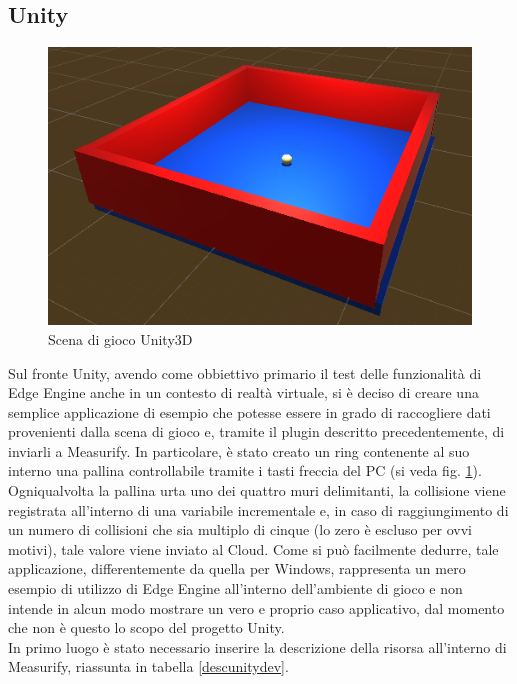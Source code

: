 \subsection{Unity}
\begin{figure}[H]
	\centering
	\includegraphics[scale=1.1]{pics/ring}
	\caption{Scena di gioco Unity3D}
	\label{ring}
\end{figure}
Sul fronte Unity, avendo come obbiettivo primario il test delle funzionalità di Edge Engine anche in un contesto di realtà virtuale, si è deciso di creare una semplice applicazione di esempio che potesse essere in grado di raccogliere dati provenienti dalla scena di gioco e, tramite il plugin descritto precedentemente, di inviarli a Measurify. In particolare, è stato creato un ring contenente al suo interno una pallina controllabile tramite i tasti freccia del PC (si veda fig. \ref{ring}). Ogniqualvolta la pallina urta uno dei quattro muri delimitanti, la collisione viene registrata all'interno di una variabile incrementale e, in caso di raggiungimento di un numero di collisioni che sia multiplo di cinque (lo zero è escluso per ovvi motivi), tale valore viene inviato al Cloud. Come si può facilmente dedurre, tale applicazione, differentemente da quella per Windows, rappresenta un mero esempio di utilizzo di Edge Engine all'interno dell'ambiente di gioco e non intende in alcun modo mostrare un vero e proprio caso applicativo, dal momento che non è questo lo scopo del progetto Unity.\\
In primo luogo è stato necessario inserire la descrizione della risorsa all'interno di Measurify, riassunta in tabella \ref{descunitydev}.

